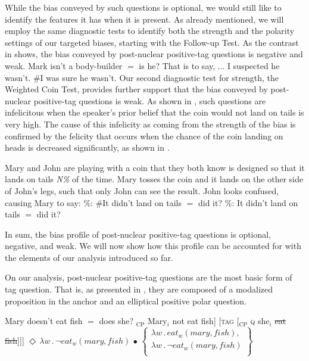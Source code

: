 \documentclass[output=paper,colorlinks,citecolor=brown]{langscibook}
\begin{document}
While the bias conveyed by such questions is optional, we would still like to identify the features it has when it is present. As already mentioned, we will employ the same diagnostic tests to identify both the strength and the polarity settings of our targeted biases, starting with the Follow-up Test. As the contrast in  shows, the bias conveyed by  post-nuclear positive-tag questions is negative and weak.
\is{}
\ea Mark isn't a body-builder $=$ is he? That is to say, ...\label{Pos.PNu.TIS}
    \ea I suspected he wasn't.
    \ex \#I was sure he wasn't.
    \z
\z
{}
Our second diagnostic test for strength, the Weighted Coin Test, provides further support that the bias conveyed by post-nuclear positive-tag questions is weak. As shown in , such questions are infelicitous when the speaker's prior belief that the coin would not land on tails is very high. The cause of this infelicity as coming from the strength of the bias is confirmed by the felicity that occurs when the chance of the coin landing on heads is decreased significantly, as shown in .

\is{}
\ea Mary and John are playing with a coin that they both know is designed so that it lands on tails \textit{N\%} of the time. Mary tosses the coin and it lands on the other side of John's legs, such that only John can see the result. John looks confused, causing Mary to say:\label{Pos.PNu.WC}
    \%: \#It didn't land on tails $=$ did it?\label{Pos.Pnu.WC.1}
    \%: It didn't land on tails $=$ did it?\label{Pos.Pnu.WC.30}
    \z
\z
{}

In sum, the bias profile of  post-nuclear positive-tag questions is optional, negative, and weak. We will now show how this profile can be accounted for with the elements of our analysis introduced so far.

On our analysis,  post-nuclear positive-tag questions are the most basic form of tag question. That is, as presented in , they are composed of a modalized proposition in the anchor and an elliptical positive polar question.

\ea Mary doesn't eat fish $=$ does she?\label{Pos.Pnu.Anyl}
    \ea {[[}$_{\text{CP}}$ Mary$_{i}$ not eat fish] [\textsc{tag} {[}$_{\text{CP}}$ \textsc{q} she$_{i}$ \sout{eat fish}]]]
    \ex $\Diamond \, \lambda w \, . \, \neg eat_w(mary, fish) \, \bullet \, \left\{ \begin{array}{l}
            \lambda w \, . \, eat_w(mary, fish), \\ 
            \lambda w \, . \,\neg eat_w(mary, fish) \\ 
            \end{array} \right\}$ 
    \z
\z
{}
\end{document}
